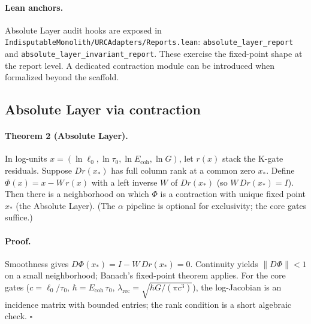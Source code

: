 \documentclass[11pt]{article}
\begin{document}
\paragraph{Lean anchors.} Absolute Layer audit hooks are exposed in \texttt{IndisputableMonolith/URCAdapters/Reports.lean}: \texttt{absolute\_layer\_report} and \texttt{absolute\_layer\_invariant\_report}. These exercise the fixed\mbox{-}point shape at the report level. A dedicated contraction module can be introduced when formalized beyond the scaffold.

\subsection{Absolute Layer via contraction}\label{subsec:absolute}
\paragraph{Theorem 2 (Absolute Layer).} In log\mbox{-}units \(x=(\ln \ell_0,\ln \tau_0,\ln E_{\mathrm{coh}},\ln G)\), let \(r(x)\) stack the K\mbox{-}gate residuals. Suppose \(D r(x_*)\) has full column rank at a common zero \(x_*\). Define \(\Phi(x)=x-W\,r(x)\) with a left inverse \(W\) of \(D r(x_*)\) (so \(W\,D r(x_*)=I\)). Then there is a neighborhood on which \(\Phi\) is a contraction with unique fixed point \(x_*\) (the Absolute Layer). (The \(\alpha\) pipeline is optional for exclusivity; the core gates suffice.)

\paragraph{Proof.} Smoothness gives \(D\Phi(x_*)=I-W\,D r(x_*)=0\). Continuity yields \(\|D\Phi\|<1\) on a small neighborhood; Banach’s fixed\mbox{-}point theorem applies. For the core gates (\(c=\ell_0/\tau_0\), \(\hbar=E_{\mathrm{coh}}\,\tau_0\), \(\lambda_{\mathrm{rec}}=\sqrt{\hbar G/(\pi c^3)}\)), the log\mbox{-}Jacobian is an incidence matrix with bounded entries; the rank condition is a short algebraic check. \hfill$\square$
\end{document}
